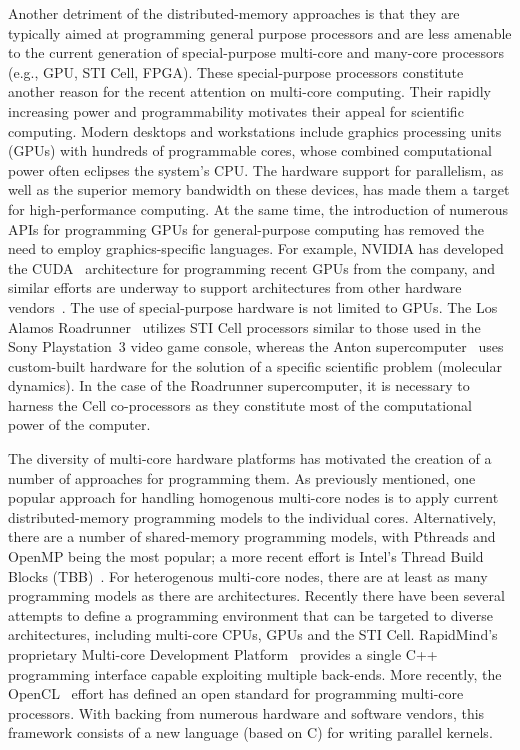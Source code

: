 \documentclass[10pt,conference,letterpaper]{IEEEtran}
\begin{document}
Another detriment of the distributed-memory approaches is that they are typically aimed at programming general purpose processors and are less amenable to the current generation of special-purpose multi-core and many-core processors (e.g., GPU, STI Cell, FPGA). These special-purpose processors constitute another reason for the recent attention on multi-core computing. Their rapidly increasing power and programmability motivates their appeal for scientific computing. Modern desktops and workstations include graphics processing units (GPUs) with hundreds of programmable cores, whose combined computational power often eclipses the system's CPU. The hardware support for parallelism, as well as the superior memory bandwidth on these devices, has made them a target for high-performance computing. At the same time, the introduction of numerous APIs for programming GPUs for general-purpose computing has removed the need to employ graphics-specific languages. For example, NVIDIA has developed the CUDA~\cite{CUDA} architecture for programming recent GPUs from the company, and similar efforts are underway to support architectures from other hardware vendors~\cite{AMDStream,BrookGPU}. The use of special-purpose hardware is not limited to GPUs. The Los Alamos Roadrunner~\cite{Roadrunner} utilizes STI Cell processors similar to those used in the Sony Playstation~3 video game console, whereas the Anton supercomputer~\cite{Anton} uses custom-built hardware for the solution of a specific scientific problem (molecular dynamics). In the case of the Roadrunner supercomputer, it is necessary to harness the Cell co-processors as they constitute most of the computational power of the computer.

The diversity of multi-core hardware platforms has motivated the creation of a number of approaches for programming them. As previously mentioned, one popular approach for handling homogenous multi-core nodes is to apply current distributed-memory programming models to the individual cores. Alternatively, there are a number of shared-memory programming models, with Pthreads and OpenMP being the most popular; a more recent effort is Intel's Thread Build Blocks (TBB)~\cite{TBB}. For heterogenous multi-core nodes, there are at least as many programming models as there are architectures. Recently there have been several attempts to define a programming environment that can be targeted to diverse architectures, including multi-core CPUs, GPUs and the STI Cell. RapidMind's proprietary Multi-core Development Platform~\cite{RapidMind} provides a single C++ programming interface capable exploiting multiple back-ends. More recently, the OpenCL~\cite{OpenCL} effort has defined an open standard for programming multi-core processors. With backing from numerous hardware and software vendors, this framework consists of a new language (based on C) for writing parallel kernels.
\end{document}
